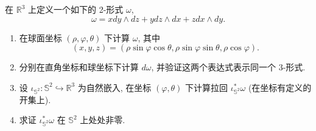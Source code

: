 \documentclass[../main.tex]{subfiles}
\begin{document}
\begin{exercise}{}{}
在 $\mathbb{R}^3$ 上定义一个如下的 2-形式 $\omega$,
\[
\omega = x dy \wedge dz + y dz \wedge dx + z dx \wedge dy.
\]
\begin{enumerate}
\item[a).] 在球面坐标 $(\rho, \varphi, \theta)$ 下计算 $\omega$, 其中
\[
(x, y, z) = (\rho \sin \varphi \cos \theta, \rho \sin \varphi \sin \theta, \rho \cos \varphi).
\]
\item[b).] 分别在直角坐标和球坐标下计算 $d\omega$, 并验证这两个表达式表示同一个 3-形式.
\item[c).] 设 $\iota_{\mathbb{S}^2} : \mathbb{S}^2 \hookrightarrow \mathbb{R}^3$ 为自然嵌入, 在坐标 $(\varphi, \theta)$ 下计算拉回 $\iota_{\mathbb{S}^2}^*\omega$ (在坐标有定义的开集上).
\item[d).] 求证 $\iota_{\mathbb{S}^2}^*\omega$ 在 $\mathbb{S}^2$ 上处处非零.
\end{enumerate}
\end{exercise}
\end{document}
